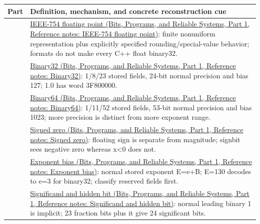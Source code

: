 {\def\LTcaptype{none} %
\begin{longtable}[]{@{}
  >{\raggedright\arraybackslash}p{}
  >{\raggedright\arraybackslash}p{}@{}}
\toprule\noalign{}
\begin{minipage}[b]{\linewidth}\raggedright
Part
\end{minipage} & \begin{minipage}[b]{\linewidth}\raggedright
Definition, mechanism, and concrete reconstruction cue
\end{minipage} \\
\midrule\noalign{}
\endhead
\bottomrule\noalign{}
\endlastfoot
61 & \href{../01-Bits-Programs-and-Reliable-Systems-P01/main.pdf\#appendix-343615f49ddf}{IEEE-754 floating point (Bits, Programs, and Reliable Systems, Part 1, Reference notes: IEEE-754 floating point)}: finite nonuniform representation plus explicitly specified rounding/special-value behavior; formats do not make every C++ float binary32. \\
62 & \href{../01-Bits-Programs-and-Reliable-Systems-P01/main.pdf\#appendix-5057f9ad327f}{Binary32 (Bits, Programs, and Reliable Systems, Part 1, Reference notes: Binary32)}: 1/8/23 stored fields, 24-bit normal precision and bias 127; 1.0 has word 3F800000. \\
63 & \href{../01-Bits-Programs-and-Reliable-Systems-P01/main.pdf\#appendix-5078dfab64e6}{Binary64 (Bits, Programs, and Reliable Systems, Part 1, Reference notes: Binary64)}: 1/11/52 stored fields, 53-bit normal precision and bias 1023; more precision is distinct from more exponent range. \\
64 & \href{../01-Bits-Programs-and-Reliable-Systems-P01/main.pdf\#appendix-3a048f032c1f}{Signed zero (Bits, Programs, and Reliable Systems, Part 1, Reference notes: Signed zero)}: floating sign is separate from magnitude; signbit sees negative zero whereas x\textless0 does not. \\
65 & \href{../01-Bits-Programs-and-Reliable-Systems-P01/main.pdf\#appendix-2fae058c82e1}{Exponent bias (Bits, Programs, and Reliable Systems, Part 1, Reference notes: Exponent bias)}: normal stored exponent E=e+B; E=130 decodes to e=3 for binary32; classify reserved fields first. \\
66 & \href{../01-Bits-Programs-and-Reliable-Systems-P01/main.pdf\#appendix-a24fd710cf67}{Significand and hidden bit (Bits, Programs, and Reliable Systems, Part 1, Reference notes: Significand and hidden bit)}: normal leading binary 1 is implicit; 23 fraction bits plus it give 24 significant bits. \\

\end{longtable}}

